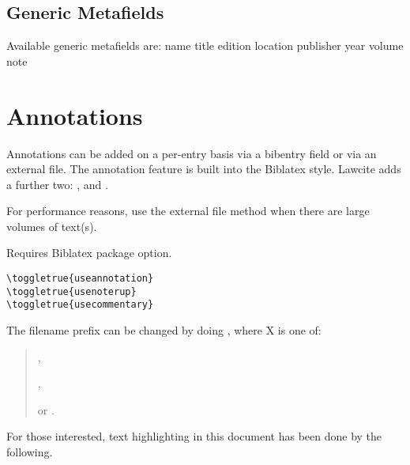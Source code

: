 \subsection{Generic Metafields}
\p Available generic metafields are:
{ name } 
{ title } 
{ edition } 
{ location } 
{ publisher } 
{ year } 
{ volume } 
{ note } 

\section{Annotations}
\p Annotations can be added on a per-entry basis via a bibentry field or via an external file. The annotation feature is built into the Biblatex style. Lawcite adds a further two: , and .

\p For performance reasons, use the external file method when there are large volumes of text(s).

\p Requires  Biblatex package option.
\toggletrue{useannotation}
\toggletrue{usenoterup}
\toggletrue{usecommentary}

\begin{verbatim}
\toggletrue{useannotation}
\toggletrue{usenoterup}
\toggletrue{usecommentary}
\end{verbatim}

\begin{quotation}
	
\noindent
{}

\noindent{}
\end{quotation}

\p The filename prefix can be changed by doing \braces{\ldots}, where X is one of:

\begin{quotation}
\noindent{},\par
\noindent {}, \par 
\noindent or . 
\end{quotation}


\togglefalse{useannotation}
\togglefalse{usenoterup}
\togglefalse{usecommentary}

\p For those interested, text highlighting in this document has been done by the following.

